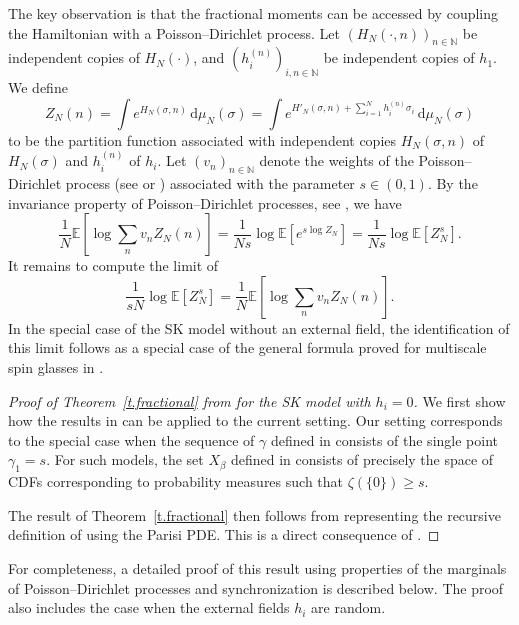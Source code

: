 \documentclass[11pt]{amsart}
\theoremstyle{remark}
\theoremstyle{definition}
\numberwithin{equation}{section}
\numberwithin{proposition}{section}
\numberwithin{figure}{section}
\numberwithin{table}{section}
\newcommand{\N}{\mathbb{N}}
\newcommand{\E}{\mathbb{E}}
\renewcommand{\geq}{\geqslant}
\newcommand{\Ll}{\left}
\newcommand{\Rr}{\right}
\renewcommand{\d}{\mathrm{d}}
\newcommand{\1}{\mathbf{1}}
\newcommand{\pnp}{{(n)}}
\begin{document}
The key observation is that the fractional moments can be accessed by coupling the Hamiltonian with a Poisson--Dirichlet process. Let $(H_N(\cdot, n) )_{n \in \N}$ be independent copies of $H_N(\cdot)$, and $(h_i^{(n)})_{i,n \in \N}$ be independent copies of $h_1$. 
%
We define
\[
Z_N(n) = \int e^{H_N(\sigma,n) } \, \d\mu_N(\sigma) = \int e^{H'_N(\sigma,n) + \sum_{i=1}^N h_i^\pnp \sigma_i} \, \d\mu_N(\sigma)
\]
to be the partition function associated with independent copies $H_N(\sigma,n)$ of $H_N(\sigma)$ and $h_i^\pnp $ of $h_i$. Let $(v_n)_{n \in \N}$ denote the weights of the Poisson--Dirichlet process (see \cite[Section~2.2]{pan} or \cite[Section~5.5]{dominguez2024book}) associated with the parameter $s\in (0,1)$.  By the invariance property of Poisson--Dirichlet processes, see \cite[Proposition~5.20]{dominguez2024book}, we have
\[
\frac{1}{N} \E \Ll[ \log \sum_{n} v_n Z_N(n) \Rr] =  \frac{1}{Ns} \log \E \Ll[ e^{s \log Z_N } \Rr] =  \frac{1}{Ns} \log \E \Ll[ Z_N^s \Rr].
\]
It remains to compute the limit of 
\begin{equation}\label{e.feRPC}
\frac{1}{sN} \log \E \Ll[ Z_N^s \Rr] = \frac{1}{N} \E \Ll[ \log \sum_{n} v_n Z_N(n) \Rr].
\end{equation}
In the special case of the SK model without an external field, the identification of this limit follows as a special case of the general formula proved for multiscale spin glasses in \cite[Theorem~2.1]{conmin}.

\begin{proof}[Proof of Theorem~\ref{t.fractional} from \cite{conmin} for the SK model with $h_i=0$]
We first show how the results in \cite{conmin} can be applied to the current setting. Our setting corresponds to the special case when the sequence of $\gamma$ defined in \cite[Equation~8]{conmin} consists of the single point $\gamma_1 = s$. For such models, the set $X_\beta$ defined in  \cite[Equation~2.2]{conmin} consists of precisely the space of CDFs corresponding to probability measures such that $\zeta( \{0\} ) \geq s$. 
	
	The result of  Theorem~\ref{t.fractional} then follows from representing the recursive definition of \cite[Equation~3.3]{conmin}  using the Parisi PDE. This is a direct consequence of \cite[Chapter~4]{pan}. 
\end{proof}

For completeness, a detailed proof of this result using properties of the marginals of Poisson--Dirichlet processes and synchronization is described below. The proof also includes the case when the external fields $h_i$ are random. 
\end{document}
